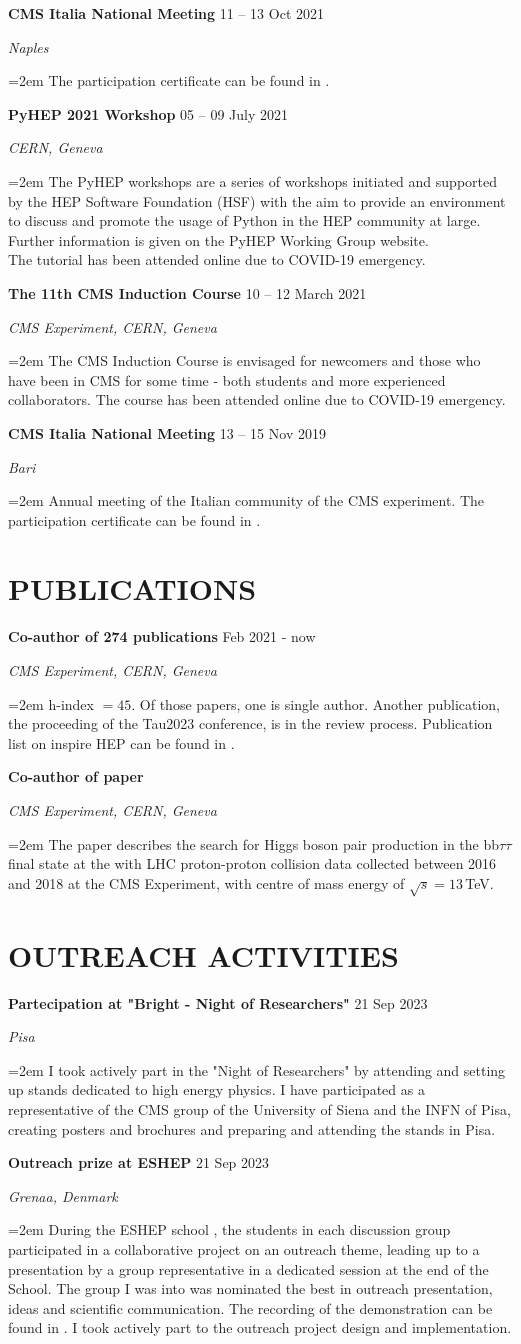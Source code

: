 \documentclass[fontsize=12pt]{article} %
\newcommand{\sepspacesmall}{\vspace*{0.3em}}
\newcommand{\NewPart}[1]{\section*{\uppercase{#1}}}
\newcommand{\EducationEntry}[4]{
	\noindent \textbf{#1} \hfill      %
	{#2} \par  %
	\noindent \textit{#3} \par        %
	\noindent\hangindent=2em\hangafter=0 \small #4 %
	\normalsize \par}
\begin{document}
	\sepspacesmall
	\EducationEntry{CMS Italia National Meeting}{11 {--} 13 Oct 2021}{Naples}{The participation certificate can be found in \cite{CMS_it2021}.}
	\sepspacesmall
	\EducationEntry{PyHEP 2021 Workshop}{05 {--} 09 July 2021}{CERN, Geneva}{The PyHEP workshops are a series of workshops initiated and supported by the HEP Software Foundation (HSF) with the aim to provide an environment to discuss and promote the usage of Python in the HEP community at large. Further information is given on the PyHEP Working Group website.\\ The tutorial has been attended online due to COVID-19 emergency. \cite{pyHEP}}
	\sepspacesmall
	\EducationEntry{The 11th CMS Induction Course}{10 {--} 12 March 2021}{CMS Experiment, CERN, Geneva}{The CMS Induction Course is envisaged for newcomers and those who have been in CMS for some time - both students and more experienced collaborators. The course has been attended online due to COVID-19 emergency. \cite{induction} }
	\sepspacesmall
	\EducationEntry{CMS Italia National Meeting}{13 {--} 15 Nov 2019}{Bari}{Annual meeting of the Italian community of the CMS experiment. The participation certificate can be found in \cite{CMSit_2019}.}
	\sepspacesmall
	\NewPart{Publications}{}
    \EducationEntry{Co-author of 274 publications}{Feb 2021 - now}{CMS Experiment, CERN, Geneva}{h-index $=45$. Of those papers, one is single author. Another publication, the proceeding of the Tau2023 conference, is in the review process. Publication list on inspire HEP can be found in \cite{publications}. \\}
     \sepspacesmall
    \EducationEntry{Co-author of paper}{ }{CMS Experiment, CERN, Geneva}{The paper describes the search for Higgs boson pair production in the bb$\tau\tau$ final state at the with LHC proton-proton collision data collected between 2016 and 2018 at the CMS Experiment, with centre of mass energy of $\sqrt{s} = 13\,$TeV. \cite{bbttananote}}
     \sepspacesmall
\NewPart{Outreach activities}
     \EducationEntry{Partecipation at "Bright - Night of Researchers" }{21 Sep 2023}{Pisa}{I took actively part in the "Night of Researchers" by attending and setting up stands dedicated to high energy physics. I have participated as a representative of the CMS group of the University of Siena and the INFN of Pisa, creating posters and brochures and preparing and attending the stands in Pisa. \cite{bright2023}}
     \sepspacesmall
     \EducationEntry{Outreach prize at ESHEP}{21 Sep 2023}{Grenaa, Denmark}{During the ESHEP school \cite{eshep}, the students in each discussion group participated in a collaborative project on an outreach theme, leading up to a presentation by a group representative in a dedicated session at the end of the School. The group I was into was nominated the best in outreach presentation, ideas and scientific communication. The recording of the demonstration can be found in \cite{neutrinoprese}. I took actively part to the outreach project design and implementation.}
\end{document}
